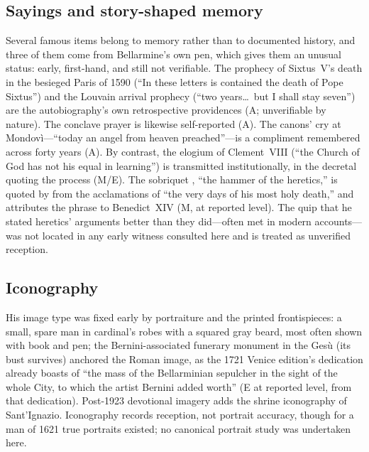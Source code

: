 \subsection{Sayings and story-shaped memory}

Several famous items belong to memory rather than to documented
history, and three of them come from Bellarmine's own pen, which
gives them an unusual status: early, first-hand, and still not
verifiable. The prophecy of Sixtus~V's death in the besieged
Paris of 1590 (``In these letters is contained the death of Pope
Sixtus'') and the Louvain arrival prophecy (``two years\ldots\ but
I shall stay seven'') are the autobiography's own retrospective
providences (A; unverifiable by nature). The conclave prayer
 is likewise self-reported (A).
The canons' cry at Mondov\`i---``today an angel from heaven
preached''---is a compliment remembered across forty years (A).
By contrast, the elogium of Clement~VIII (``the Church of God has
not his equal in learning'') is transmitted institutionally, in
the decretal quoting the process (M/E). The sobriquet
, ``the hammer of the heretics,'' is
quoted by  from the acclamations of
``the very days of his most holy death,'' and 
attributes the phrase to Benedict~XIV (M, at reported level). The
quip that he stated heretics' arguments better than they
did---often met in modern accounts---was not located in any early
witness consulted here and is treated as unverified reception.

\subsection{Iconography}

His image type was fixed early by portraiture and the printed
frontispieces: a small, spare man in cardinal's robes with a
squared gray beard, most often shown with book and pen; the
Bernini-associated funerary monument in the Ges\`u (its bust
survives) anchored the Roman image, as the 1721 Venice edition's
dedication already boasts of ``the mass of the Bellarminian
sepulcher in the sight of the whole City, to which the artist
Bernini added worth'' (E at reported level, from that
dedication). Post-1923 devotional imagery adds the shrine
iconography of Sant'Ignazio. Iconography records reception, not
portrait accuracy, though for a man of 1621 true portraits
existed; no canonical portrait study was undertaken here.

